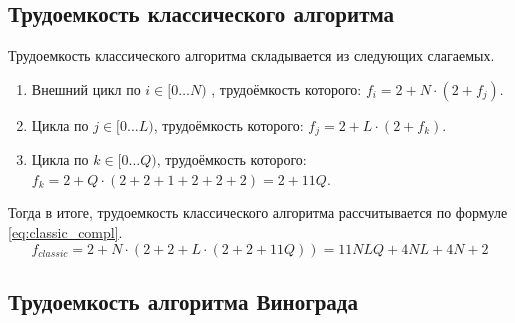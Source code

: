 \subsection{Трудоемкость классического алгоритма}

Трудоемкость классического алгоритма складывается из следующих слагаемых.
\begin{enumerate}
	\item Внешний цикл по $i \in [0 \ldots N)$ , трудоёмкость которого: $f_{i} = 2 + N \cdot (2 + f_{j})$.
	\item Цикла по $j \in [0 \ldots L)$, трудоёмкость которого: $f_{j} = 2 + L \cdot (2 + f_{k})$.
	\item Цикла по $k \in [0 \ldots Q)$, трудоёмкость которого: $f_{k} = 2 + Q \cdot (2 + 2 + 1 + 2 + 2 + 2) = 2 + 11Q$.
\end{enumerate}

\clearpage
Тогда в итоге, трудоемкость классического алгоритма рассчитывается по формуле \eqref{eq:classic_compl}.
\begin{equation}
	\label{eq:classic_compl}
	f_{classic} = 2 + N \cdot (2 + 2 + L \cdot (2 + 2 + 11Q)) = 11NLQ + 4NL + 4N + 2
\end{equation}

\subsection{Трудоемкость алгоритма Винограда}


